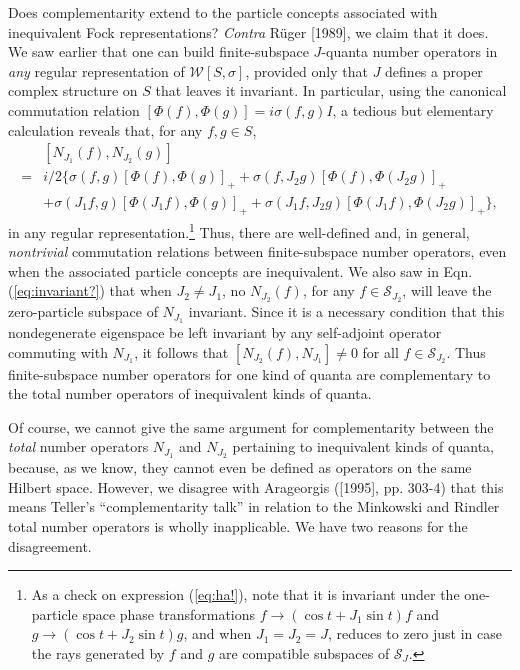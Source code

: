 \documentclass[12pt]{article}
\theoremstyle{remark}
\theoremstyle{definition}
\newcommand{\alg}[1]{\mathcal{#1}}
\newcommand{\hil}[1]{\mathcal{#1}}
\begin{document}
Does complementarity extend to the particle concepts associated with 
inequivalent Fock representations?  \emph{Contra}
 R\"{u}ger [1989], we claim that it does.  We saw 
earlier that one can build finite-subspace $J$-quanta number operators 
in \emph{any} regular 
representation of $\alg{W}[S,\sigma]$, provided only that $J$ defines a 
proper complex structure on $S$ that leaves it 
invariant.  In particular, using the canonical commutation relation 
$[\Phi(f),\Phi(g)]=i\sigma(f,g)I$, 
a tedious but elementary calculation reveals that, for any $f,g\in S$,
\begin{eqnarray} & [N_{J_{1}}(f),N_{J_{2}}(g)] \nonumber \\ \label{eq:ha!}
 = & i/2\{\sigma(f,g)[\Phi(f),\Phi(g)]_{+}+
\sigma(f,J_{2}g)[\Phi(f),\Phi(J_{2}g)]_{+} \\  \nonumber
& +\sigma(J_{1}f,g)[\Phi(J_{1}f),\Phi(g)]_{+}
+\sigma(J_{1}f,J_{2}g)[\Phi(J_{1}f),\Phi(J_{2}g)]_{+}\},
\end{eqnarray}
in any regular representation.\footnote{As a check on expression
  (\ref{eq:ha!}), note that it is invariant under the one-particle
  space phase transformations $f\rightarrow (\cos t+J_{1}\sin t)f$ and
  $g\rightarrow (\cos t+J_{2}\sin t)g$, and when $J_{1}=J_{2}=J$,
  reduces to zero just in case the rays generated by $f$ and $g$ are
  compatible subspaces of $\hil{S}_{J}$.}  Thus, there are
well-defined and, in general, \emph{nontrivial} commutation relations
between finite-subspace number operators, even when the associated
particle concepts are inequivalent.  We also saw in Eqn.
(\ref{eq:invariant?})  that when $J_{2}\not=J_{1}$, no $N_{J_{2}}(f)$,
for any $f\in \hil{S}_{J_{2}}$, will leave the zero-particle subspace
of $N_{J_{1}}$ invariant.  Since it is a necessary condition that this
nondegenerate eigenspace be left invariant by any self-adjoint
operator commuting with $N_{J_{1}}$, it follows that
$[N_{J_{2}}(f),N_{J_{1}}]\not=0$ for all $f\in \hil{S}_{J_{2}}$.  Thus
finite-subspace number operators for one kind of quanta are
complementary to the total number operators of inequivalent kinds of
quanta.

Of course, we cannot give the same argument for 
complementarity between the \emph{total} number operators 
$N_{J_{1}}$ and $N_{J_{2}}$ pertaining to 
inequivalent kinds of quanta, because, as we know, they cannot even be defined as 
operators on the 
same Hilbert space.  However, we disagree with Arageorgis ([1995], pp. 
303-4) that this means Teller's ``complementarity talk'' in relation 
to the Minkowski and Rindler total number operators is wholly inapplicable.  
We have two reasons for the 
disagreement.  
\end{document}
